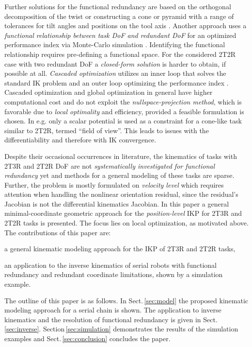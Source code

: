 \documentclass[graybox,vecphys]{svmult}
\begin{document}
Further solutions for the functional redundancy are based on the orthogonal decomposition of the twist \cite{HuoBar2005} or constructing a cone or pyramid with a range of tolerances for tilt angles and positions on the tool axis \cite{FromGra2010}.
Another approach uses a \emph{functional relationship between task DoF and redundant DoF} for an optimized performance index via Monte-Carlo simulation \cite{ZanchettinRocRobJoh2011}.
Identifying the functional relationship requires pre-defining a functional space.
For the considered 2T2R case with two redundant DoF a \emph{closed-form solution} is harder to obtain, if possible at all.
%
\emph{Cascaded optimization} utilizes an inner loop that solves the standard IK problem and an outer loop optimizing the performance index \cite{ZhuQuCaoYan2013}. 
%
Cascaded optimization and global optimization in general have higher computational cost and do not exploit the \emph{nullspace-projection method}, which is favorable due to \emph{local optimality} and efficiency, provided a feasible formulation is chosen. 
In \cite{MoeAntTeePet2016} e.g. only a scalar potential is used as a constraint for a cone-like task similar to 2T2R, termed ``field of view''. 
This leads to issues with the differentiability \cite{MoeAntTeePet2016} and therefore with IK convergence.

Despite their occasional occurrences in literature, the kinematics of tasks with 2T3R and 2T2R DoF are not \emph{systematically investigated for functional redundancy} yet and methods for a general modeling of these tasks are sparse. 
Further, the problem is mostly formulated on \emph{velocity level} which requires attention when handling the nonlinear orientation residual, since the residual's Jacobian is not  the differential kinematics Jacobian.
In this paper a general minimal-coordinate geometric approach for the \emph{position-level} IKP for 2T3R and 2T2R tasks is presented. 
The focus lies on local optimization, as motivated above.
%
The contributions of this paper are:
\begin{compactitem}
\item a general kinematic modeling approach for the IKP of 2T3R and 2T2R tasks,
\item an application to the inverse kinematics of serial robots with functional redundancy and redundant coordinate limitations, shown by a simulation example.
\end{compactitem} 

The outline of this paper is as follows. In Sect.\,\ref{sec:model} the proposed kinematic modeling approach for a serial chain is shown. 
The application to inverse kinematics and the resolution of functional redundancy is given in Sect.\,\ref{sec:inverse}. 
Section\,\ref{sec:simulation} demonstrates the results of the simulation examples and Sect.\,\ref{sec:conclusion} concludes the paper.
\end{document}
